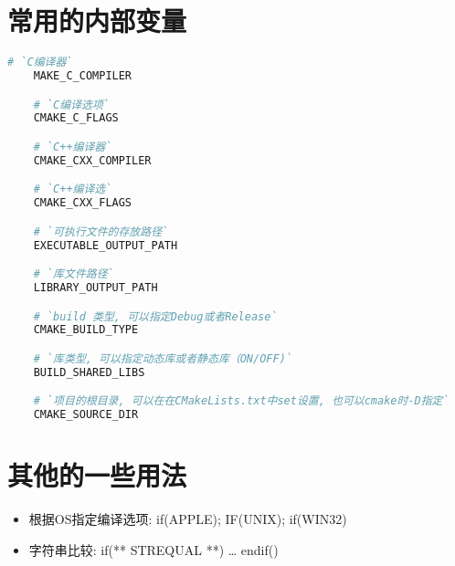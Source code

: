 \section{\ZHH 常用的内部变量}{
\begin{lstlisting}[language=bash]
    # `C编译器`
    MAKE_C_COMPILER

    # `C编译选项`
    CMAKE_C_FLAGS

    # `C++编译器`
    CMAKE_CXX_COMPILER

    # `C++编译选`
    CMAKE_CXX_FLAGS

    # `可执行文件的存放路径`
    EXECUTABLE_OUTPUT_PATH

    # `库文件路径`
    LIBRARY_OUTPUT_PATH

    # `build 类型, 可以指定Debug或者Release`
    CMAKE_BUILD_TYPE

    # `库类型, 可以指定动态库或者静态库（ON/OFF)`
    BUILD_SHARED_LIBS

    # `项目的根目录, 可以在在CMakeLists.txt中set设置, 也可以cmake时-D指定`
    CMAKE_SOURCE_DIR
\end{lstlisting}
}

\section{\ZHH 其他的一些用法}{
\begin {itemize}
\item { 根据OS指定编译选项: if(APPLE); IF(UNIX); if(WIN32) }\par
\item { 字符串比较: if(** STREQUAL **) … endif() }\par
\end {itemize}
}


